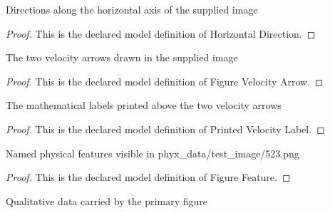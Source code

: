 \begin{definition}
  \label{def:physics:phyx-mini-0523:phyxminiproblems-problemphyxmini0523-horizontaldirection}
  Directions along the horizontal axis of the supplied image
\end{definition}
\begin{proof}
  This is the declared model definition of Horizontal Direction.
\end{proof}
\begin{definition}
  \label{def:physics:phyx-mini-0523:phyxminiproblems-problemphyxmini0523-figurevelocityarrow}
  The two velocity arrows drawn in the supplied image
\end{definition}
\begin{proof}
  This is the declared model definition of Figure Velocity Arrow.
\end{proof}
\begin{definition}
  \label{def:physics:phyx-mini-0523:phyxminiproblems-problemphyxmini0523-printedvelocitylabel}
  The mathematical labels printed above the two velocity arrows
\end{definition}
\begin{proof}
  This is the declared model definition of Printed Velocity Label.
\end{proof}
\begin{definition}
  \label{def:physics:phyx-mini-0523:phyxminiproblems-problemphyxmini0523-figurefeature}
  Named physical features visible in phyx\_data/test\_image/523.png
\end{definition}
\begin{proof}
  This is the declared model definition of Figure Feature.
\end{proof}
\begin{definition}
  \label{def:physics:phyx-mini-0523:phyxminiproblems-problemphyxmini0523-truckbaseballfigure}
  Qualitative data carried by the primary figure
\end{definition}
